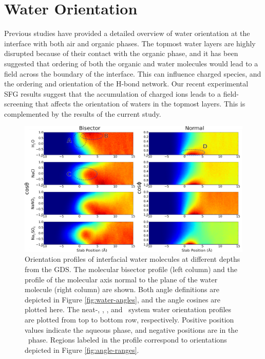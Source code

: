 \section{Water Orientation}

Previous studies have provided a detailed overview of water orientation at the interface with both air and organic phases.\cite{McFearin2009,Hore2008,Fan2009,Wick2006c,Wick2008a} The topmost water layers are highly disrupted because of their contact with the organic phase, and it has been suggested that ordering of both the organic and water molecules would lead to a field across the boundary of the interface.\cite{McFearin2009,Hore2008} This can influence charged species, and the ordering and orientation of the H-bond network. Our recent experimental SFG results suggest that the accumulation of charged ions leads to a field-screening that affects the orientation of waters in the topmost layers. This is complemented by the results of the current study.

\begin{figure}[h!]
\begin{center}
	\includegraphics[scale=1.0]{images/h2o-2dhistograms.png}
	\caption{Orientation profiles of interfacial water molecules at different depths from the GDS. The molecular bisector profile (left column) and the profile of the molecular axis normal to the plane of the water molecule (right column) are shown. Both angle definitions are depicted in Figure \ref{fig:water-angles}, and the angle cosines are plotted here. The neat-\ctcwat, \nacl, \sodnit, and \sodsul~system water orientation profiles are plotted from top to bottom row, respectively. Positive position values indicate the aqueous phase, and negative positions are in the \ctc~phase. Regions labeled in the profile correspond to orientations depicted in Figure \ref{fig:angle-ranges}.}
	\label{fig:2dhisto}
\end{center}
\end{figure}



